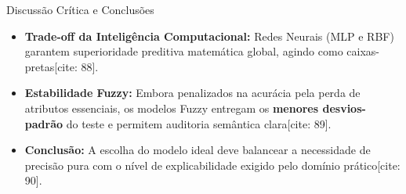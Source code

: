 \documentclass[10pt, aspectratio=169]{beamer}
\begin{document}
\begin{frame}{Discussão Crítica e Conclusões}
    \begin{itemize}
        \item \textbf{Trade-off da Inteligência Computacional:} Redes Neurais (MLP e RBF) garantem superioridade preditiva matemática global, agindo como caixas-pretas[cite: 88].
        \item \textbf{Estabilidade Fuzzy:} Embora penalizados na acurácia pela perda de atributos essenciais, os modelos Fuzzy entregam os \textbf{menores desvios-padrão} do teste e permitem auditoria semântica clara[cite: 89].
        \item \textbf{Conclusão:} A escolha do modelo ideal deve balancear a necessidade de precisão pura com o nível de explicabilidade exigido pelo domínio prático[cite: 90].
    \end{itemize}
\end{frame}
\end{document}
